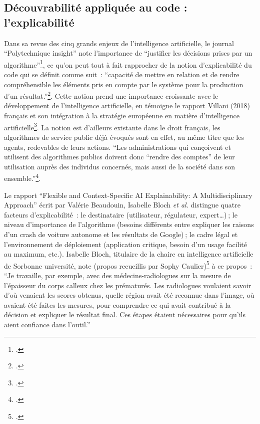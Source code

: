 \subsection{Découvrabilité appliquée au code : l'explicabilité}

Dans sa revue des cinq grands enjeux de l’intelligence artificielle, le journal \enquote{Polytechnique insight} note l’importance de \enquote{justifier les décisions prises par un algorithme}\footcite{noauthor_nouveaux_nodate}, ce qu’on peut tout à fait rapprocher de la notion d’explicabilité du code qui se définit comme suit : \enquote{capacité de mettre en relation et de rendre compréhensible les éléments pris en compte par le système pour la production d’un résultat.}\footcite{zotero-315}. Cette notion prend une importance croissante avec le développement de l’intelligence artificielle, en témoigne le rapport Villani (2018) français et son intégration à la stratégie européenne en matière d’intelligence artificielle\footcite[p. 14]{maxwell_comment_2020}. La notion est d’ailleurs existante dans le droit français, les algorithmes de service public déjà évoqués sont en effet, au même titre que les agents, redevables de leurs actions. \enquote{Les administrations qui conçoivent et utilisent des algorithmes publics doivent donc “rendre des comptes” de leur utilisation auprès des individus concernés, mais aussi de la société dans son ensemble.}\footcite{noauthor_algorithmes_nodate-1}. 

Le rapport \enquote{Flexible and Context-Specific AI Explainability: A Multidisciplinary Approach} écrit par Valérie Beaudouin, Isabelle Bloch \textit{et al.} distingue quatre facteurs d’explicabilité : le destinataire (utilisateur, régulateur, expert…) ; le niveau d’importance de l’algorithme (besoins différents entre expliquer les raisons d’un crash de voiture autonome et les résultats de Google) ; le cadre légal et l’environnement de déploiement (application critique, besoin d’un usage facilité au maximum, etc.). Isabelle Bloch, titulaire de la chaire en intelligence artificielle de Sorbonne université, note (propos recueillis par Sophy Caulier)\footcite{noauthor_nouveaux_nodate} à ce propos : \enquote{Je travaille, par exemple, avec des médecins-radiologues sur la mesure de l’épaisseur du corps calleux chez les prématurés. Les radiologues voulaient savoir d’où venaient les scores obtenus, quelle région avait été reconnue dans l’image, où avaient été faites les mesures, pour comprendre ce qui avait contribué à la décision et expliquer le résultat final. Ces étapes étaient nécessaires pour qu’ils aient confiance dans l’outil.}

